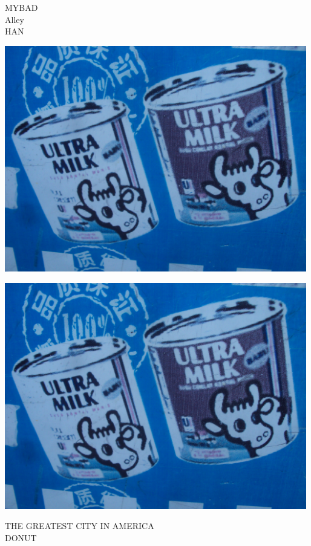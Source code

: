\documentclass[10pt,letterpaper]{article}
\begin{document}
MYBAD\\
Alley\\
HAN\\
\pagebreak

\includegraphics[width=5.19in]{landscape.jpg}

\vspace{0.25in}
\includegraphics[width=5.19in]{landscape.jpg}

THE GREATEST CITY IN AMERICA\\
DONUT\\
\pagebreak
\end{document}
